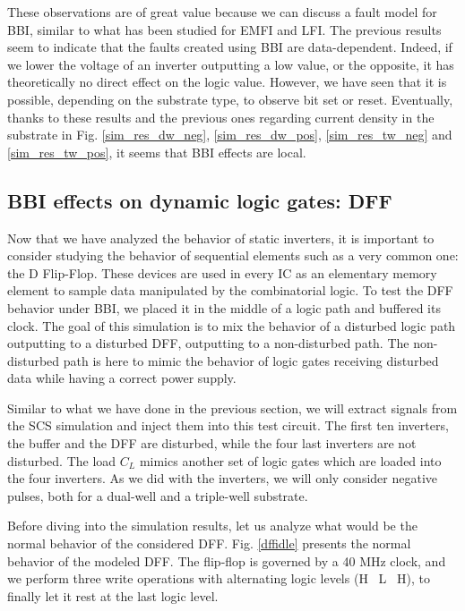 	These observations are of great value because we can discuss a fault model for BBI, similar to what has been studied for EMFI and LFI.
	The previous results seem to indicate that the faults created using BBI are data-dependent.
	Indeed, if we lower the voltage of an inverter outputting a low value, or the opposite, it has theoretically no direct effect on the logic value.
	However, we have seen that it is possible, depending on the substrate type, to observe bit set or reset.
	Eventually, thanks to these results and the previous ones regarding current density in the substrate in Fig. \ref{sim_res_dw_neg}, \ref{sim_res_dw_pos}, \ref{sim_res_tw_neg} and \ref{sim_res_tw_pos}, it seems that BBI effects are local.

\subsection{BBI effects on dynamic logic gates: DFF}
	
	Now that we have analyzed the behavior of static inverters, it is important to consider studying the behavior of sequential elements such as a very common one: the D Flip-Flop.
	These devices are used in every IC as an elementary memory element to sample data manipulated by the combinatorial logic.
	To test the DFF behavior under BBI, we placed it in the middle of a logic path and buffered its clock.
	The goal of this simulation is to mix the behavior of a disturbed logic path outputting to a disturbed DFF, outputting to a non-disturbed path.
	The non-disturbed path is here to mimic the behavior of logic gates receiving disturbed data while having a correct power supply.
	
	Similar to what we have done in the previous section, we will extract signals from the SCS simulation and inject them into this test circuit.
	The first ten inverters, the buffer and the DFF are disturbed, while the four last inverters are not disturbed.
	The load $C_L$ mimics another set of logic gates which are loaded into the four inverters.
	As we did with the inverters, we will only consider negative pulses, both for a dual-well and a triple-well substrate.
	
	Before diving into the simulation results, let us analyze what would be the normal behavior of the considered DFF.
	Fig. \ref{dffidle} presents the normal behavior of the modeled DFF.
	The flip-flop is governed by a 40 MHz clock, and we perform three write operations with alternating logic levels (H \textrightarrow\ L \textrightarrow\ H), to finally let it rest at the last logic level.
	
